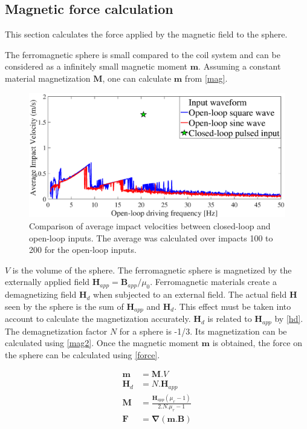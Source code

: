 \documentclass[letterpaper, 10 pt, conference]{ieeeconf}  %
\begin{document}
\subsection{Magnetic force calculation}
\label{magforce}

This section calculates the force applied by the magnetic field to the sphere.\par
The ferromagnetic sphere is small compared to the coil system and can be considered as a infinitely small magnetic moment $\mathbf{m}$. Assuming a constant material magnetization $\mathbf{M}$, one can calculate $\mathbf{m}$ from \cref{mag}.

\begin{figure}
	\includegraphics[width=\linewidth]{CLvsOL.eps}
	\caption{Comparison of average impact velocities between closed-loop and open-loop inputs. The average was calculated over impacts 100 to 200 for the open-loop inputs.}
	\label{CLvsOL}
\end{figure}

 $V$ is the volume of the sphere.
The ferromagnetic sphere is magnetized by the externally applied field $\mathbf{H}_{app}=\mathbf{B}_{app}/\mu_0$. Ferromagnetic materials create a demagnetizing field $\mathbf{H}_d$ when subjected to an external field. The actual field $\mathbf{H}$ seen by the sphere is the sum of $\mathbf{H}_{app}$ and $\mathbf{H}_d$. This effect must be taken into account to calculate the magnetization accurately. $\mathbf{H}_d$ is related to $\mathbf{H}_{app}$ by \cref{hd}. The demagnetization factor $N$ for a sphere is -1/3. Its magnetization can be calculated using \cref{mag2}.
Once the magnetic moment $\mathbf{m}$ is obtained, the force on the sphere can be calculated using \cref{force}.

\begin{align}
\mathbf{m}&=\mathbf{M}.V \label{mag}\\
\mathbf{H}_d&=N.\mathbf{H}_{app}\label{hd}\\
\mathbf{M}&=\frac{\mathbf{H}_{app}\left ( \mu_r-1  \right )}{2.N.\mu_r-1} \label{mag2}\\
\mathbf{F}&=\mathbf{\nabla}(\mathbf{m}.\mathbf{B}) \label{force}
\end{align}
\end{document}
